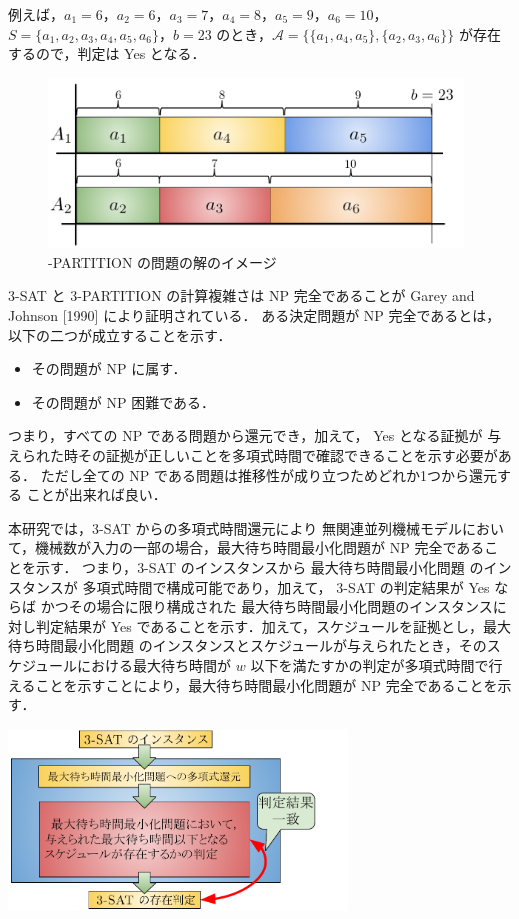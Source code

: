 \documentclass[12pt]{optlab-bachelor}
\begin{document}
例えば，$a_1 = 6$，$a_2 = 6$，$a_3 = 7$，$a_4 = 8$，$a_5 = 9$，$a_6 = 10$，$S = \{a_1, a_2, a_3, a_4, a_5, a_6\}$，$b = 23$ のとき，$\mathcal{A} = \big\{\{a_1, a_4, a_5\}, \{a_2, a_3, a_6\}\big\}$ が存在するので，判定は Yes となる．

\begin{figure}[h]
  \centering
  \includegraphics[width = 11cm]{figure/3-PARTITION.pdf}
  \caption{{-PARTITION} の問題の解のイメージ}
\end{figure}

\textsc{3-SAT} と \textsc{3-PARTITION} の計算複雑さは NP 完全であることが Garey and Johnson [1990] \cite{3SAT} により証明されている．
ある決定問題が NP 完全であるとは，以下の二つが成立することを示す．
\begin{itemize}
  \item その問題が NP に属す．
  \item その問題が NP 困難である．
\end{itemize}
つまり，すべての NP である問題から還元でき，加えて， Yes となる証拠が
与えられた時その証拠が正しいことを多項式時間で確認できることを示す必要がある．
ただし全ての NP である問題は推移性が成り立つためどれか1つから還元する
ことが出来れば良い．

本研究では，\textsc{3-SAT} からの多項式時間還元により 無関連並列機械モデルにおいて，機械数が入力の一部の場合，最大待ち時間最小化問題が NP 完全であることを示す．
つまり，\textsc{3-SAT} のインスタンスから 最大待ち時間最小化問題 のインスタンスが
多項式時間で構成可能であり，加えて， \textsc{3-SAT}  の判定結果が Yes ならば
かつその場合に限り構成された  最大待ち時間最小化問題のインスタンスに対し判定結果が Yes であることを示す．加えて，スケジュールを証拠とし，最大待ち時間最小化問題 のインスタンスとスケジュールが与えられたとき，そのスケジュールにおける最大待ち時間が $w$ 以下を満たすかの判定が多項式時間で行えることを示すことにより，最大待ち時間最小化問題が NP 完全であることを示す．

\begin{center}
  \includegraphics[width = 9cm]{figure/reduction.pdf}
\end{center}
\end{document}
